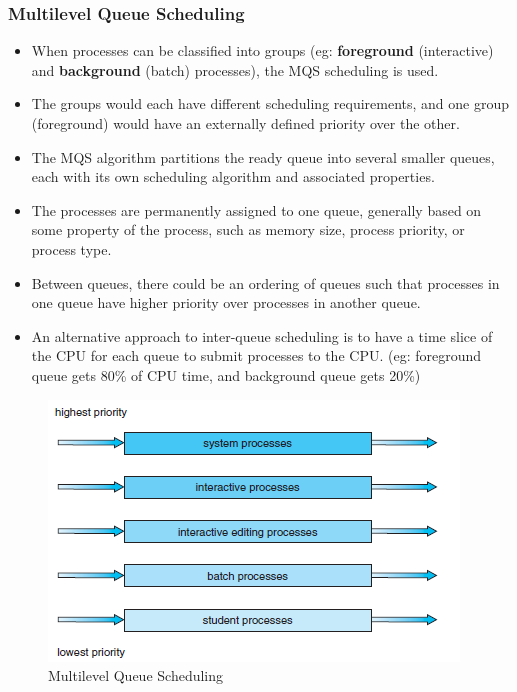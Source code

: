 \documentclass{article}
\theoremstyle{plain}
\theoremstyle{definition}
\begin{document}
\subsubsection{Multilevel Queue Scheduling}
\begin{itemize}
    \item When processes can be classified into groups (eg: \textbf{foreground} (interactive) and \textbf{background} (batch) processes), the MQS scheduling is used. 
    
    \item The groups would each have different scheduling requirements, and one group (foreground) would have an externally defined priority over the other. 
    
    \item The MQS algorithm partitions the ready queue into several smaller queues, each with its own scheduling algorithm and associated properties. 
    
    \item The processes are permanently assigned to one queue, generally based on some property of the process, such as memory size, process priority, or process type.
    
    \item Between queues, there could be an ordering of queues such that processes in one queue have higher priority over processes in another queue. 
    
    \item An alternative approach to inter-queue scheduling is to have a time slice of the CPU for each queue to submit processes to the CPU. (eg: foreground queue gets 80\% of CPU time, and background queue gets 20\%)
\end{itemize}

\begin{figure}[t]
    \centering
    \includegraphics{os20.png}
    \caption{Multilevel Queue Scheduling}
    \label{fig:my_label_zzzzz}
\end{figure}
\end{document}

